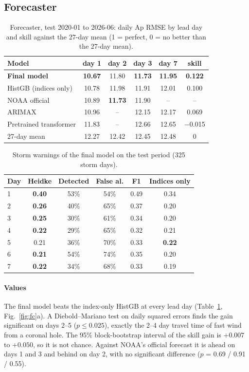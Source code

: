 \documentclass[conference,a4paper]{IEEEtran}
\begin{document}
\subsection{Forecaster}
\begin{table}[h]\centering\footnotesize
\caption{Forecaster, test 2020-01 to 2026-06: daily Ap RMSE by lead day and skill against the 27-day mean
(1 = perfect, 0 = no better than the 27-day mean).}\label{tab:fc}
\setlength{\tabcolsep}{3pt}
\begin{tabular}{@{}lccccc@{}}\toprule
Model & day 1 & day 2 & day 3 & day 7 & skill\\\midrule
\textbf{Final model} & \textbf{10.67} & 11.80 & \textbf{11.73} & \textbf{11.95} & \textbf{0.122}\\
HistGB (indices only) & 10.78 & 11.98 & 11.91 & 12.01 & 0.100\\
NOAA official & 10.89 & \textbf{11.73} & 11.90 & -- & --\\
ARIMAX & 10.96 & -- & 12.15 & 12.17 & 0.069\\
Pretrained transformer & 11.83 & -- & 12.66 & 12.65 & $-$0.015\\
27-day mean & 12.27 & 12.42 & 12.45 & 12.48 & 0\\\bottomrule
\end{tabular}
\end{table}
\begin{table}[h]\centering\footnotesize
\caption{Storm warnings of the final model on the test period (325 storm days).}\label{tab:storm}
\setlength{\tabcolsep}{4pt}
\begin{tabular}{@{}lccccc@{}}\toprule
Day & Heidke & Detected & False al. & F1 & Indices only\\\midrule
1 & \textbf{0.40} & 53\% & 54\% & 0.49 & 0.34\\
2 & \textbf{0.26} & 40\% & 65\% & 0.37 & 0.20\\
3 & \textbf{0.25} & 30\% & 61\% & 0.34 & 0.20\\
4 & \textbf{0.22} & 29\% & 65\% & 0.32 & 0.21\\
5 & 0.21 & 36\% & 70\% & 0.33 & \textbf{0.22}\\
6 & \textbf{0.21} & 54\% & 74\% & 0.35 & 0.20\\
7 & \textbf{0.22} & 34\% & 68\% & 0.33 & 0.19\\\bottomrule
\end{tabular}
\end{table}

\paragraph{Values} The final model beats the index-only HistGB at every lead day (Table~\ref{tab:fc},
Fig.~\ref{fig:fc}a). A Diebold--Mariano test \cite{diebold1995} on daily squared errors finds the gain significant on
days 2--5 ($p\le0.025$), exactly the 2--4 day travel time of fast wind from a coronal hole. The 95\% block-bootstrap
interval of the skill gain is $+0.007$ to $+0.050$, so it is not chance. Against NOAA's official forecast it is ahead
on days 1 and 3 and behind on day 2, with no significant difference ($p$ = 0.69 / 0.91 / 0.55).
\end{document}

